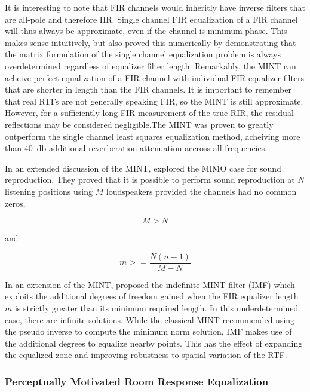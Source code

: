  It is interesting to note that FIR channels would inheritly have inverse filters that are all-pole and therefore IIR. Single channel FIR equalization of a FIR channel will thus always be approximate, even if the channel is minimum phase. This makes sense intuitively, but \cite{miyoshi1986inverse} also proved this numerically by demonstrating that the matrix formulation of the single channel equalization problem is always overdetermined regardless of equalizer filter length. Remarkably, the MINT can acheive perfect equalization of a FIR channel with individual FIR equalizer filters that are shorter in length than the FIR channels. It is important to remember that real RTFs are not generally speaking FIR, so the MINT is still approximate. However, for a sufficiently long FIR measurement of the true RIR, the residual reflections may be considered negligible.The MINT was proven to greatly outperform the single channel least squares equalization method, acheiving more than \qty{40}{\decibel} additional reverberation attenuation accross all frequencies.
 
In an extended discussion of the MINT,  \cite{miyoshi1988inverse} explored the MIMO case for sound reproduction. They proved that it is possible to perform sound reproduction at $N$ listening positions using $M$ loudspeakers provided the channels had no common zeros,

\begin{equation}
	M > N
\end{equation}

and

\begin{equation}
	m >= \frac{N(n-1)}{M-N}
\end{equation}

In an extension of the MINT, \cite{nakajima1997sound} proposed the indefinite MINT filter (IMF) which exploits the additional degrees of freedom gained when the FIR equalizer length $m$ is strictly greater than its minimum required length. In this underdetermined case, there are infinite solutions. While the classical MINT recommended using the pseudo inverse to compute the minimum norm solution, IMF makes use of the additional degrees to equalize nearby points. This has the effect of expanding the equalized zone and improving robustness to spatial variation of the RTF.

\subsubsection{Perceptually Motivated Room Response Equalization}

